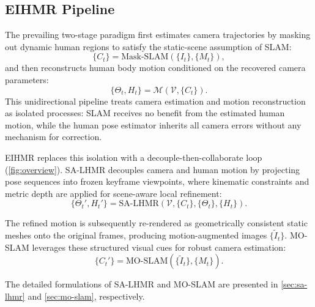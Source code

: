 \subsection{EIHMR Pipeline}
\label{sec:pipeline}

The prevailing two-stage paradigm first estimates camera trajectories by masking out dynamic human regions to satisfy the static-scene assumption of SLAM:
%
\begin{equation}
  \{C_t\} = \text{Mask-SLAM}(\{I_t\}, \{M_t\}),
\end{equation}
%
and then reconstructs human body motion conditioned on the recovered camera parameters:
%
\begin{equation}
  \{\Theta_t, H_t\} = \mathcal{M}(\mathcal{V}, \{C_t\}).
\end{equation}
%
This unidirectional pipeline treats camera estimation and motion reconstruction as isolated processes: SLAM receives no benefit from the estimated human motion, while the human pose estimator inherits all camera errors without any mechanism for correction.

EIHMR replaces this isolation with a decouple-then-collaborate loop (\cref{fig:overview}). SA-LHMR decouples camera and human motion by projecting pose sequences into frozen keyframe viewpoints, where kinematic constraints and metric depth are applied for scene-aware local refinement:
%
\begin{equation}
  \{\Theta_t', H_t'\} = \text{SA-LHMR}\left(\mathcal{V}, \{C_t\}, \{\Theta_t\}, \{H_t\}\right).
\end{equation}

The refined motion is subsequently re-rendered as geometrically consistent static meshes onto the original frames, producing motion-augmented images $\{\tilde{I}_t\}$. MO-SLAM leverages these structured visual cues for robust camera estimation:
%
\begin{equation}
  \{C_t'\} = \text{MO-SLAM}\left(\{\tilde{I}_t\}, \{M_t\}\right).
\end{equation}

The detailed formulations of SA-LHMR and MO-SLAM are presented in \cref{sec:sa-lhmr} and \cref{sec:mo-slam}, respectively.



